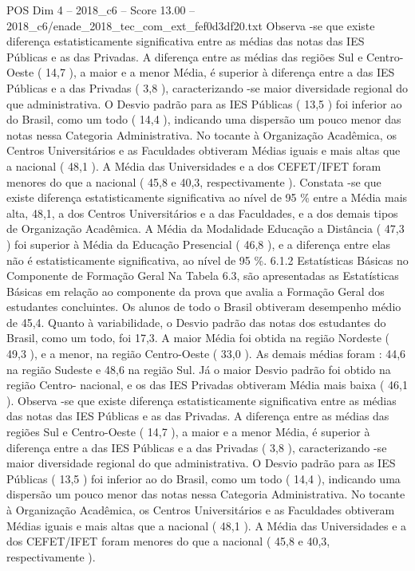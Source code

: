 \begin{textsample}{POS Dim 4 – 2018\_c6 – Score 13.00 – 2018\_c6/enade\_2018\_tec\_com\_ext\_fef0d3df20.txt}
Observa -se que existe diferença estatisticamente significativa entre as médias das notas das IES Públicas e as das Privadas.
A diferença entre as médias das regiões Sul e Centro-Oeste ( 14,7 ), a maior e a menor Média, é superior à diferença entre a das IES Públicas e a das Privadas ( 3,8 ), caracterizando -se maior diversidade regional do que administrativa.
O Desvio padrão para as IES Públicas ( 13,5 ) foi inferior ao do Brasil, como um todo ( 14,4 ), indicando uma dispersão um pouco menor das notas nessa Categoria Administrativa.
No tocante à Organização Acadêmica, os Centros Universitários e as Faculdades obtiveram Médias iguais e mais altas que a nacional ( 48,1 ).
A Média das Universidades e a dos CEFET/IFET foram menores do que a nacional ( 45,8 e 40,3, respectivamente ).
Constata -se que existe diferença estatisticamente significativa ao nível de 95 \% entre a Média mais alta, 48,1, a dos Centros Universitários e a das Faculdades, e a dos demais tipos de Organização Acadêmica.
A Média da Modalidade Educação a Distância ( 47,3 ) foi superior à Média da Educação Presencial ( 46,8 ), e a diferença entre elas não é estatisticamente significativa, ao nível de 95 \%. 6.1.2 Estatísticas Básicas no Componente de Formação Geral Na Tabela 6.3, são apresentadas as Estatísticas Básicas em relação ao componente da prova que avalia a Formação Geral dos estudantes concluintes.
Os alunos de todo o Brasil obtiveram desempenho médio de 45,4.
Quanto à variabilidade, o Desvio padrão das notas dos estudantes do Brasil, como um todo, foi 17,3.
A maior Média foi obtida na região Nordeste ( 49,3 ), e a menor, na região Centro-Oeste ( 33,0 ).
As demais médias foram : 44,6 na região Sudeste e 48,6 na região Sul.
Já o maior Desvio padrão foi obtido na região Centro- nacional, e os das IES Privadas obtiveram Média mais baixa ( 46,1 ).
Observa -se que existe diferença estatisticamente significativa entre as médias das notas das IES Públicas e as das Privadas.
A diferença entre as médias das regiões Sul e Centro-Oeste ( 14,7 ), a maior e a menor Média, é superior à diferença entre a das IES Públicas e a das Privadas ( 3,8 ), caracterizando -se maior diversidade regional do que administrativa.
O Desvio padrão para as IES Públicas ( 13,5 ) foi inferior ao do Brasil, como um todo ( 14,4 ), indicando uma dispersão um pouco menor das notas nessa Categoria Administrativa.
No tocante à Organização Acadêmica, os Centros Universitários e as Faculdades obtiveram Médias iguais e mais altas que a nacional ( 48,1 ).
A Média das Universidades e a dos CEFET/IFET foram menores do que a nacional ( 45,8 e 40,3, respectivamente ).

\end{textsample}
